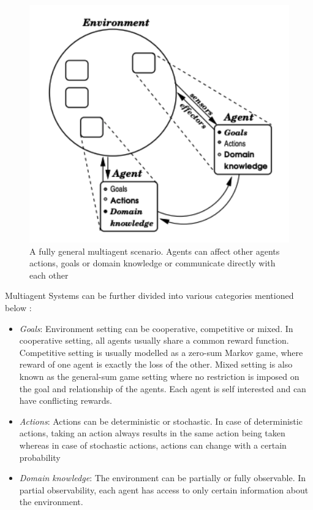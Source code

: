\documentclass[12pt]{report}
\begin{document}
\begin{figure}[!h]
    \centering
    \includegraphics[width=12cm]{MultiAgentSystem.png}
    \caption{A fully general multiagent scenario. Agents can affect other agents actions, goals or domain knowledge or communicate directly with each other \cite{Stone}}
    \label{fig:MultiAgentSystem}
\end{figure}


Multiagent Systems can be further divided into various categories mentioned below \cite{SurveyandArticle}:

\begin{itemize}
    \item \emph{Goals}: Environment setting can be cooperative, competitive or mixed. In cooperative setting, all agents usually share a common reward function. Competitive setting is usually modelled as a zero-sum Markov game, where reward of one agent is exactly the loss of the other. Mixed setting is also known as the general-sum game setting where no restriction is imposed on the goal and relationship of the agents. Each agent is self interested and can have conflicting rewards.
    \item \emph{Actions}: Actions can be deterministic or stochastic. In case of deterministic actions, taking an action always results in the same action being taken whereas in case of stochastic actions, actions can change with a certain probability
    \item \emph{Domain knowledge}: The environment can be partially or fully observable. In partial observability, each agent has access to only certain information about the environment. 
\end{itemize}
\end{document}

